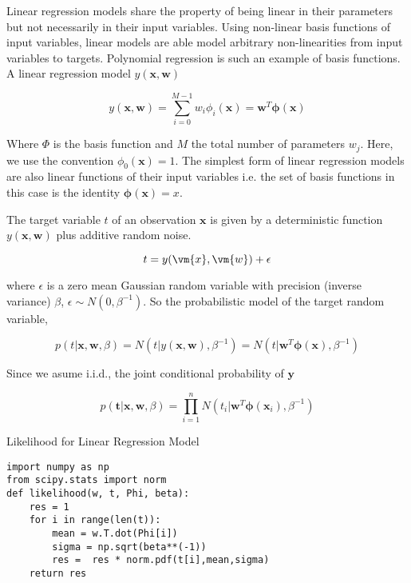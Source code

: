 Linear regression models share the property of being linear in their parameters but not necessarily in their input variables.
Using non-linear basis functions of input variables, linear models are able model arbitrary non-linearities from input variables to targets.  
Polynomial regression is such an example of basis functions.
A linear regression model $y(\bm{x},\bm{w})$

\begin{equation}
y(\bm{x},\bm{w}) = \sum_{i=0}^{M-1} w_i \phi_i(\bm{x}) = \bm{w}^T \bm{\phi}(\bm{x})
\end{equation}

Where $\Phi$ is the basis function and $M$ the total number of parameters $w_j$.
Here, we use the convention $\phi_0(\bm{x})=1$.
The simplest form of linear regression models are also linear functions of their input variables i.e. the set of basis functions in this case is the identity $\bm{\phi}(\bm{x})=x$. 

The target variable $t$ of an observation $\bm{x}$ is given by a deterministic function $y(\bm{x},\bm{w})$ plus additive random noise.

\begin{equation}
 t = y(\vm{x},\vm{w}) + \epsilon
\end{equation}

where $\epsilon$ is a zero mean Gaussian random variable with precision (inverse variance) $\beta$, $\epsilon \sim N(0,\beta^{-1})$.
So the probabilistic model of the target random variable,

\begin{equation}
p(t | \bm{x}, \bm{w}, \beta) = N(t | y(\bm{x},\bm{w}), \beta^{-1}) = N(t | \bm{w}^T \bm{\phi}(\bm{x}) , \beta^{-1})
\end{equation}

Since we asume i.i.d., the joint conditional probability of $\bm{y}$

\begin{equation}
p(\bm{t} | \bm{x}, \bm{w}, \beta) = \prod_{i=1}^n N(t_i | \bm{w}^T \bm{\phi}(\bm{x}_i) , \beta^{-1})
\end{equation}


\begin{algorithm}
  \caption{Likelihood for Linear Regression Model}
  \label{alg:likelihood_for_linear_regression_model}
\begin{lstlisting}
import numpy as np
from scipy.stats import norm 
def likelihood(w, t, Phi, beta):
    res = 1
    for i in range(len(t)):
        mean = w.T.dot(Phi[i])
        sigma = np.sqrt(beta**(-1))
        res =  res * norm.pdf(t[i],mean,sigma)
    return res
\end{lstlisting}
\end{algorithm}


